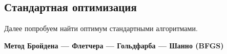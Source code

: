 \documentclass[11pt,a4paper]{article}
\begin{document}
    \begin{center}
    \end{center}
    
    \hypertarget{ux441ux442ux430ux43dux434ux430ux440ux442ux43dux430ux44f-ux43eux43fux442ux438ux43cux438ux437ux430ux446ux438ux44f}{%
\subsection{Стандартная
оптимизация}\label{ux441ux442ux430ux43dux434ux430ux440ux442ux43dux430ux44f-ux43eux43fux442ux438ux43cux438ux437ux430ux446ux438ux44f}}

    Далее попробуем найти оптимум стандартными алгоритмами.

    \textbf{Метод Бройдена --- Флетчера --- Гольдфарба --- Шанно (BFGS)}
\end{document}
